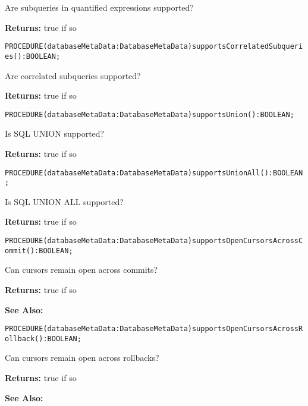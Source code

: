 Are subqueries in quantified expressions supported?


{\bf Returns: } 
true if so



\verb'PROCEDURE(databaseMetaData:DatabaseMetaData)supportsCorrelatedSubqueries():BOOLEAN;'






Are correlated subqueries supported?


{\bf Returns: } 
true if so 




\verb'PROCEDURE(databaseMetaData:DatabaseMetaData)supportsUnion():BOOLEAN;'






Is SQL UNION supported? 


{\bf Returns: } 
true if so 




\verb'PROCEDURE(databaseMetaData:DatabaseMetaData)supportsUnionAll():BOOLEAN;'






Is SQL UNION ALL supported? 


{\bf Returns: } 
true if so 




\verb'PROCEDURE(databaseMetaData:DatabaseMetaData)supportsOpenCursorsAcrossCommit():BOOLEAN;'






Can cursors remain open across commits? 


{\bf Returns: } 
true if so 

{\bf See Also:} 




\verb'PROCEDURE(databaseMetaData:DatabaseMetaData)supportsOpenCursorsAcrossRollback():BOOLEAN;'






Can cursors remain open across rollbacks? 


{\bf Returns: } 
true if so 

{\bf See Also:} 




